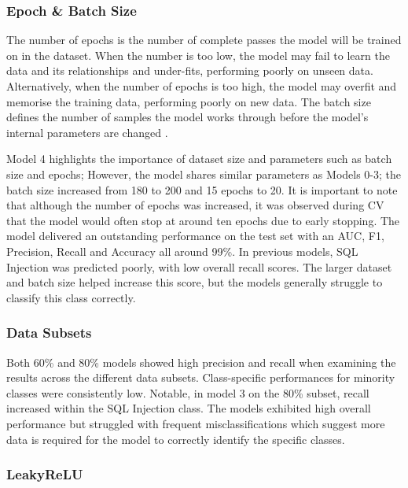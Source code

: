 \subsubsection*{Epoch \& Batch Size}

The number of epochs is the number of complete passes the model will be trained on in the dataset. When the number is too low, the model may fail to learn the data and its relationships and under-fits, performing poorly on unseen data. Alternatively, when the number of epochs is too high, the model may overfit and memorise the training data, performing poorly on new data. The batch size defines the number of samples the model works through before the model's internal parameters are changed \parencite{brownlee_2018_difference}. %

Model 4 highlights the importance of dataset size and parameters such as batch size and epochs; However, the model shares similar parameters as Models 0-3; the batch size increased from 180 to 200 and 15 epochs to 20. It is important to note that although the number of epochs was increased, it was observed during CV that the model would often stop at around ten epochs due to early stopping. The model delivered an outstanding performance on the test set with an AUC, F1, Precision, Recall and Accuracy all around 99\%. In previous models, SQL Injection was predicted poorly, with low overall recall scores. The larger dataset and batch size helped increase this score, but the models generally struggle to classify this class correctly. 


\subsubsection*{Data Subsets}

Both 60\% and 80\% models showed high precision and recall when examining the results across the different data subsets. Class-specific performances for minority classes were consistently low. Notable, in model 3 on the 80\% subset, recall increased within the SQL Injection class. The models exhibited high overall performance but struggled with frequent misclassifications which suggest more data is required for the model to correctly identify the specific classes.

\subsubsection*{LeakyReLU}

